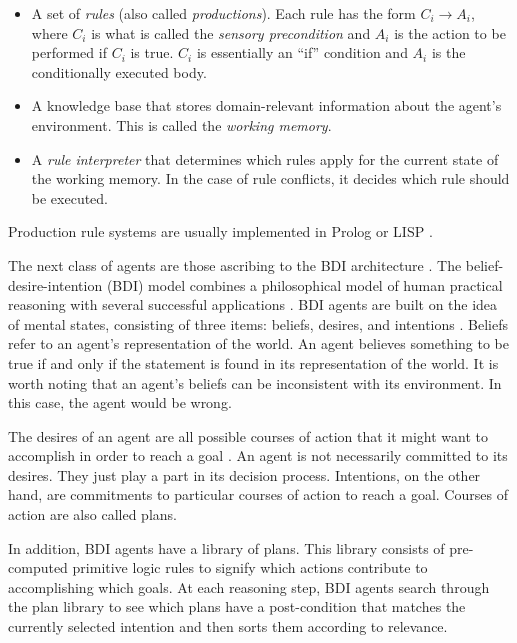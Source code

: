 \begin{itemize}

    \item A set of \textit{rules} (also called \textit{productions}).
        Each rule has the form $ C_i \rightarrow A_i $,
        where $ C_i $ is what is called the \textit{sensory precondition}
        and $ A_i $ is the action to be performed if $ C_i $ is true.
        $ C_i $ is essentially an ``if'' condition and $ A_i $ is the conditionally executed body.

    \item A knowledge base that stores domain-relevant information about the agent's environment.
        This is called the \textit{working memory}.

    \item A \textit{rule interpreter} that determines which rules apply for the current state of the working memory.
        In the case of rule conflicts, it decides which rule should be executed.

\end{itemize}


Production rule systems are usually implemented in Prolog or LISP \cite{balke_how_2014}.

The next class of agents are those ascribing to the BDI architecture \cite{balke_how_2014}.
The belief-desire-intention (BDI) model combines a philosophical model of human practical reasoning
with several successful applications \cite{georgeff_belief-desire-intention_1999}.
BDI agents are built on the idea of mental states,
consisting of three items: beliefs, desires, and intentions \cite{balke_how_2014}.
Beliefs refer to an agent's representation of the world.
An agent believes something to be true if and only if the statement is found in its representation of the world.
It is worth noting that an agent's beliefs can be inconsistent with its environment.
In this case, the agent would be wrong.

\cite{rao_modeling_1991}

The desires of an agent are all possible courses of action that it might want to accomplish in order to reach a goal \cite{balke_how_2014}.
An agent is not necessarily committed to its desires.
They just play a part in its decision process.
Intentions, on the other hand, are commitments to particular courses of action to reach a goal.
Courses of action are also called plans.

In addition, BDI agents have a library of plans.
This library consists of pre-computed primitive logic rules to signify which actions contribute to accomplishing which goals.
At each reasoning step, BDI agents search through the plan library to see which plans have a post-condition that matches the currently selected intention
and then sorts them according to relevance.

